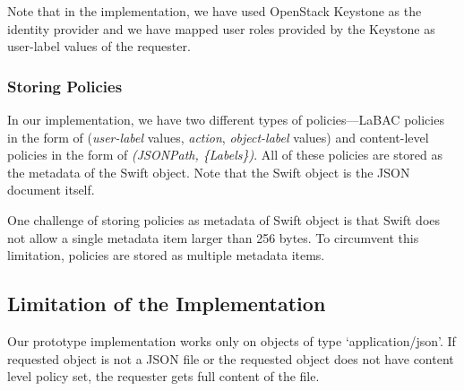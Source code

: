 Note that in the implementation,  we have used OpenStack Keystone \cite{keystone} as the identity provider and we have mapped user roles provided by the Keystone as user-label values of the requester.

\subsubsection{Storing Policies}
	In our implementation, we have two different types of policies---LaBAC policies in the form of (\emph{user-label} values, \emph{action},  \emph{object-label} values) and content-level policies in the form of \emph{(JSONPath, \{Labels\})}. All of these policies are stored as the metadata of the Swift object. Note that the Swift object is the JSON document itself.
	
	One challenge of storing policies as metadata of Swift object is that Swift does not allow a single metadata item larger than 256 bytes. To circumvent this limitation, policies are stored as multiple metadata items.




\subsection{ Limitation of the Implementation}

	 Our prototype implementation works only on objects of type `application/json'. If requested object is not a JSON file or the requested object does not have content level policy set, the requester gets full content of the file.
	
